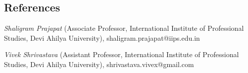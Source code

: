\documentclass[margin,line]{resume}
\begin{document}
\begin{resume}
    \section{\mysidestyle References} 

    \begin{list2}
    \item {\sl Shaligram Prajapat} (Associate Professor, International Institute of Professional Studies, Devi Ahilya University), shaligram.prajapat@iips.edu.in
	\item {\sl Vivek Shrivastava} (Assistant Professor, International Institute of Professional Studies, Devi Ahilya University), shrivastava.vivex@gmail.com
    \end{list2}

\end{resume}
\end{document}
